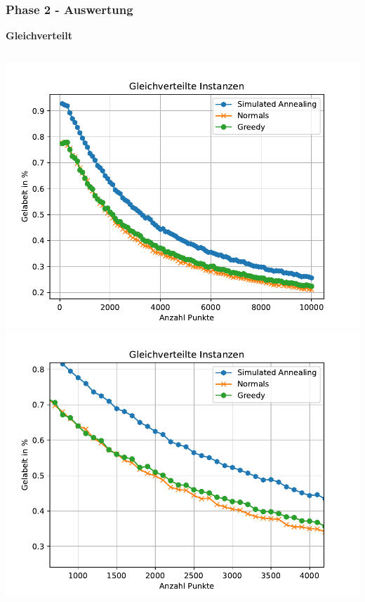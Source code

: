 \documentclass[aspectratio=169]{beamer}
\begin{document}


\begin{frame}
	\frametitle{Phase 2 - Auswertung}
	\textbf{Gleichverteilt}
	\begin{columns}[c] %
		
		\includegraphics[scale=.41]{random_instances.pdf}
		\includegraphics[scale=.41]{random_instances_detail.pdf}\\
		
	
	\end{columns}
	\end{frame}
	
\end{document}
